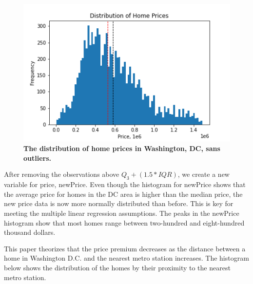 \documentclass[12pt]{report}
\newcommand\tab[1][.60cm]{\hspace*{#1}}
\begin{document}
\clearpage
\begin{figure}[h]
\begin{center}
\caption{\textbf{The distribution of home prices in Washington, DC, sans outliers.}}
\includegraphics[width=130mm]{newPriceHist.png}
\end{center}
\label{fig:NewpriceHist}
\end{figure}
After removing the observations above $Q_3+(1.5*IQR)$, we create a new variable for price, newPrice. Even though the histogram for newPrice shows that the average price for homes in the DC area is higher than the median price, the new price data is now more normally distributed than before. This is key for meeting the multiple linear regression assumptions. The peaks in the newPrice histogram show that most homes range between two-hundred and eight-hundred thousand dollars. \\
\clearpage

\tab This paper theorizes that the price premium decreases as the distance between a home in Washington D.C. and the nearest metro station increases. The histogram below shows the distribution of the homes by their proximity to the nearest metro station.
\end{document}
